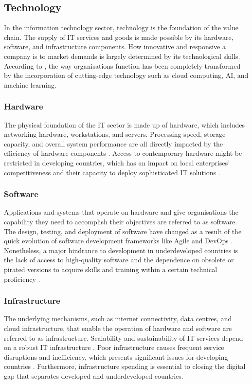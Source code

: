\subsection{Technology}
\par{In the information technology sector, technology is the foundation of the value chain. The supply of IT services and goods is made possible by its hardware, software, and infrastructure components. How innovative and responsive a company is to market demands is largely determined by its technological skills. According to \cite{brynjolfsson2014second}, the way organisations function has been completely transformed by the incorporation of cutting-edge technology such as cloud computing, AI, and machine learning.}
\subsubsection{Hardware}
\par{The physical foundation of the IT sector is made up of hardware, which includes networking hardware, workstations, and servers. Processing speed, storage capacity, and overall system performance are all directly impacted by the efficiency of hardware components \citep{hennessy2017computer}. Access to contemporary hardware might be restricted in developing countries, which has an impact on local enterprises' competitiveness and their capacity to deploy sophisticated IT solutions \citep{heeks2017information}.}
\subsubsection{Software}
\par{Applications and systems that operate on hardware and give organisations the capability they need to accomplish their objectives are referred to as software. The design, testing, and deployment of software have changed as a result of the quick evolution of software development frameworks like Agile and DevOps \citep{bass2015devops}. Nonetheless, a major hindrance to development in underdeveloped countries is the lack of access to high-quality software and the dependence on obsolete or pirated versions to acquire skills and training within a certain technical proficiency \citep{ojo2020political}.}
\subsubsection{Infrastructure}
\par{The underlying mechanisms, such as internet connectivity, data centres, and cloud infrastructure, that enable the operation of hardware and software are referred to as infrastructure. Scalability and sustainability of IT services depend on a robust IT infrastructure \citep{ross2006enterprise}. Poor infrastructure causes frequent service disruptions and inefficiency, which presents significant issues for developing countries \citep{ojo2020political}. Furthermore, infrastructure spending is essential to closing the digital gap that separates developed and underdeveloped countries.}
